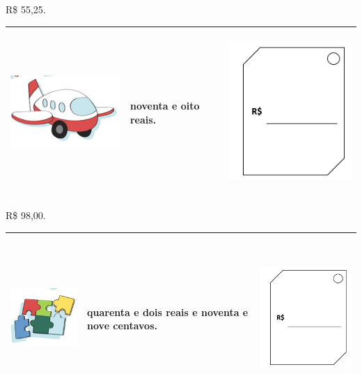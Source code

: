 R\$ 55,25.

\begin{longtable}[]{@{}lll@{}}
\toprule
\includegraphics[width=1.96902in,height=1.29185in]{media/image58.png} &
noventa e oito reais. &
\includegraphics[width=2.19822in,height=2.44826in]{media/image56.png}\tabularnewline
\bottomrule
\end{longtable}

R\$ 98,00.

\begin{longtable}[]{@{}lll@{}}
\toprule
\includegraphics[width=1.60439in,height=1.38561in]{media/image59.png} &
quarenta e dois reais e noventa e nove centavos. &
\includegraphics[width=2.19822in,height=2.44826in]{media/image56.png}\tabularnewline
\bottomrule
\end{longtable}

